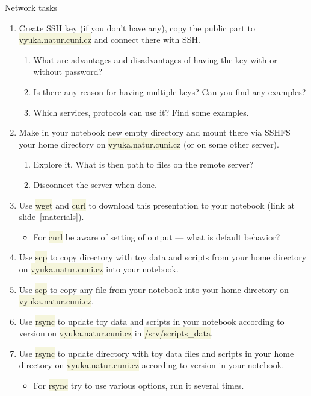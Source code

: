 \documentclass[compress, xelatex, 11pt, xcolor=svgnames, aspectratio=169,
	hyperref={
		bookmarks=true,
		unicode=true,
		colorlinks=true,
		pdftitle={Linux, command line and MetaCentrum},
		plainpages=false,
		pdfauthor={Vojtech Zeisek},
		pdfsubject={Course about use of Linux command line, writing shell scripts and using MetaCentrum of CESNET},
		pdfcreator={XeLaTeX},
		pdfkeywords={Linux, GNU, BASH, shell, command line, MetaCentrum},
		linkcolor=DarkRed, %
		anchorcolor=DarkBlue, %
		citecolor=Indigo, %
		filecolor=NavyBlue, %
		menucolor=DarkMagenta, %
		urlcolor=DarkBlue, %
		},
	url={hyphens, lowtilde} %
	]{beamer}
\renewcommand{\texttt}[1]{\colorbox{Beige}{{\ttfamily #1}}}
\begin{document}
\begin{frame}[allowframebreaks]{Network tasks}
	\begin{enumerate}
		\item Create SSH key (if you don't have any), copy the public part to \texttt{vyuka.natur.cuni.cz} and connect there with SSH.
		\begin{enumerate}
			\item What are advantages and disadvantages of having the key with or without password?
			\item Is there any reason for having multiple keys? Can you find any examples?
			\item Which services, protocols can use it? Find some examples.
		\end{enumerate}
		\item Make in your notebook new empty directory and mount there via SSHFS your home directory on \texttt{vyuka.natur.cuni.cz} (or on some other server).
		\begin{enumerate}
			\item Explore it. What is then path to files on the remote server?
			\item Disconnect the server when done.
		\end{enumerate}
		\item Use \texttt{wget} and \texttt{curl} to download this presentation to your notebook (link at slide~\ref{materials}).
		\begin{itemize}
			\item For \texttt{curl} be aware of setting of output --- what is default behavior?
		\end{itemize}
		\item Use \texttt{scp} to copy directory with toy data and scripts from your home directory on \texttt{vyuka.natur.cuni.cz} into your notebook.
		\item Use \texttt{scp} to copy any file from your notebook into your home directory on \texttt{vyuka.natur.cuni.cz}.
		\item Use \texttt{rsync} to update toy data and scripts in your notebook according to version on \texttt{vyuka.natur.cuni.cz} in \texttt{/srv/scripts\_data}.
		\item Use \texttt{rsync} to update directory with toy data files and scripts in your home directory on \texttt{vyuka.natur.cuni.cz} according to version in your notebook.
		\begin{itemize}
			\item For \texttt{rsync} try to use various options, run it several times.

\end{itemize}
\end{enumerate}
\end{frame}
\end{document}
